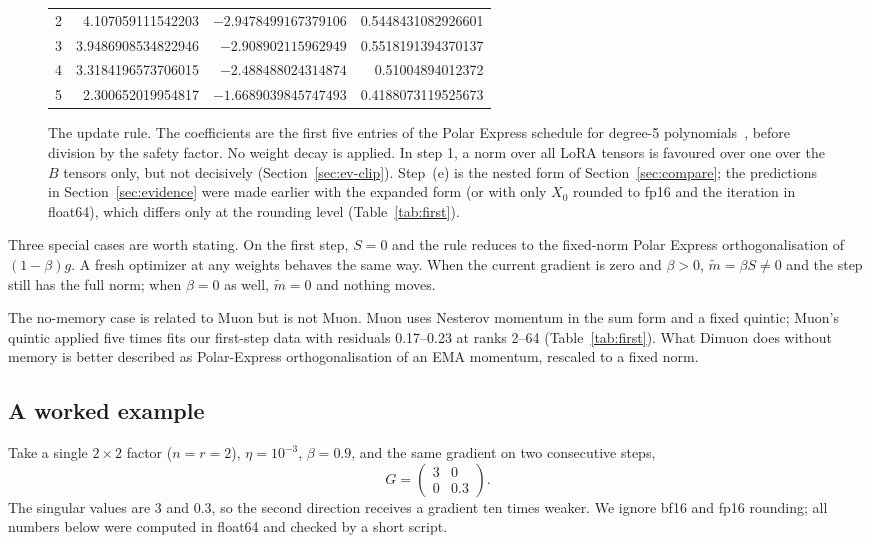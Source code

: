 \documentclass[11pt]{article}
\begin{document}
\begin{figure}[ht]
{\begin{minipage}{0.94\linewidth}
\begin{center}
\begin{tabular}{crrr}
2 & 4.107059111542203 & $-2.9478499167379106$ & 0.5448431082926601\\
3 & 3.9486908534822946 & $-2.908902115962949$ & 0.5518191394370137\\
4 & 3.3184196573706015 & $-2.488488024314874$ & 0.51004894012372\\
5 & 2.300652019954817 & $-1.6689039845747493$ & 0.4188073119525673\\\bottomrule
\end{tabular}
\end{center}
\end{minipage}}
\caption{The update rule. The coefficients are the first five entries of the Polar Express schedule
for degree-5 polynomials~\cite{polarexpress}, before division by the safety factor. No weight decay
is applied. In step 1, a norm over all LoRA tensors is favoured over one over the $B$ tensors only,
but not decisively (Section~\ref{sec:ev-clip}). Step~(e) is the nested form of Section~\ref{sec:compare}; the predictions in
Section~\ref{sec:evidence} were made earlier with the expanded form (or with only $X_0$ rounded to
fp16 and the iteration in float64), which differs only at the rounding level (Table~\ref{tab:first}).}
\label{box:rule}
\end{figure}

Three special cases are worth stating. On the first step, $S=0$ and the rule reduces to the fixed-norm
Polar Express orthogonalisation of $(1-\beta)g$. A fresh optimizer at any weights behaves the same
way. When the current gradient is zero and $\beta>0$, $\tilde m=\beta S\neq0$ and the step still has
the full norm; when $\beta=0$ as well, $\tilde m=0$ and nothing moves.

The no-memory case is related to Muon but is not Muon. Muon uses Nesterov momentum in the sum form and
a fixed quintic; Muon's quintic applied five times fits our first-step data with residuals 0.17--0.23
at ranks 2--64 (Table~\ref{tab:first}). What Dimuon does without memory is better described as
Polar-Express orthogonalisation of an EMA momentum, rescaled to a fixed norm.

\subsection{A worked example}\label{sec:example}
Take a single $2\times2$ factor ($n=r=2$), $\eta=10^{-3}$, $\beta=0.9$, and the same gradient on two
consecutive steps,
\[
G=\begin{pmatrix}3&0\\0&0.3\end{pmatrix}.
\]
The singular values are 3 and 0.3, so the second direction receives a gradient ten times weaker. We
ignore bf16 and fp16 rounding; all numbers below were computed in float64 and checked by a short
script.
\end{document}
